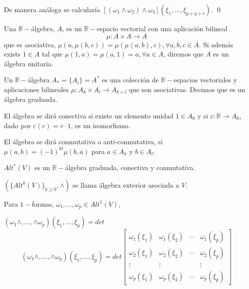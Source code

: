 De manera análoga se calcularía $[(\omega_1\wedge \omega_2)\wedge \omega_3](\xi_1,\dots,\xi_{p+q+r})$. \qed

\begin{Def}
Una $\mathbb{R}-$álgebra, $A$, es un $\mathbb{R}-$espacio vectorial con una aplicación bilineal
$$\mu:A\times A \rightarrow A $$
que es asociativa, $\mu(a,\mu(b,c))=\mu(\mu(a,b),c),\forall a,b,c\in A$. Si además exists $1\in A$ tal que $\mu(1,a)=\mu(a,1)=a, \forall a \in A$, diremos que $A$ es un álgebra unitaria. 
\end{Def}

\begin{itemize*}
\item Un $\mathbb{R}-$álgebra $A_*=\{A_i\}=A^*$ es una colección de $\mathbb{R}-$espacios vectoriales y aplicaciones bilineales $\mu:A_k\times A_l \rightarrow A_{k+l}$ que son asociativas. Decimos que es un álgebra graduada.
\item El álgebra se dirá conectiva si existe un elemento unidad $1\in A_0$ y si $\varepsilon:\mathbb{R}\rightarrow A_0$, dado por $\varepsilon(r)=r\cdot 1$, es un isomorfismo.
\item El álgebra se dirá conmutativa o anti-conmutativa, si $\mu(a,b)=(-1)^{kl}\mu(b,a)$ para $a\in A_k$ y $b\in A_l$. 
\end{itemize*}

\begin{Teo}
$Alt^*(V)$ es un $\mathbb{R}-$álgebra graduada, conectiva y conmutativa.
\end{Teo}

\begin{nota}
$(\{Alt^k(V)\}_{k\ge 0},\wedge)$ se llama álgebra exterior asociada a $V$. 
\end{nota}

\newpage
\begin{Lem}
\label{sec:lem1}
Para $1-$formas, $\omega_1,\dots,\omega_p \in Alt^1(V) $,

$(\omega_1\wedge,\dots,\wedge \omega_p)(\xi_1,\dots,\xi_p)=det$ \[(\omega_1\wedge,\dots,\wedge \omega_p)(\xi_1,\dots,\xi_p)=det
  \begin{bmatrix}
    \omega_1(\xi_1) & \omega_1(\xi_2) & \cdots & \omega_1(\xi_p) \\
    \omega_2(\xi_1) & \omega_2(\xi_2) & \cdots & \omega_2(\xi_p) \\
        \vdots     &   \vdots        &        & \vdots \\
    \omega_p(\xi_1) & \omega_p(\xi_2) & \cdots & \omega_p(\xi_p)
  \end{bmatrix}
\]

\end{Lem}

